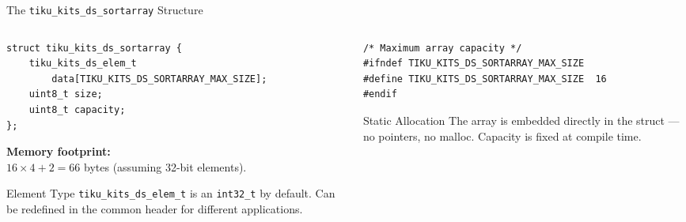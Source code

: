 \documentclass[aspectratio=169, 10pt]{beamer}
\begin{document}
\begin{frame}[fragile]{The \texttt{tiku\_kits\_ds\_sortarray} Structure}
\begin{columns}[T]
\begin{column}{0.48\textwidth}
\begin{lstlisting}[style=cstyle,
  title={Sorted array structure}]
struct tiku_kits_ds_sortarray {
    tiku_kits_ds_elem_t
        data[TIKU_KITS_DS_SORTARRAY_MAX_SIZE];
    uint8_t size;
    uint8_t capacity;
};
\end{lstlisting}

\vspace{0.3em}
\textbf{Memory footprint:}\\
$16 \times 4 + 2 = 66$ bytes (assuming 32-bit elements).

\vspace{0.5em}
\begin{block}{Element Type}
\texttt{tiku\_kits\_ds\_elem\_t} is an \texttt{int32\_t} by default.
Can be redefined in the common header for different
applications.
\end{block}
\end{column}

\begin{column}{0.48\textwidth}
\begin{lstlisting}[style=cstyle,
  title={Configuration macros}]
/* Maximum array capacity */
#ifndef TIKU_KITS_DS_SORTARRAY_MAX_SIZE
#define TIKU_KITS_DS_SORTARRAY_MAX_SIZE  16
#endif
\end{lstlisting}

\vspace{0.3em}
\begin{center}
\end{center}

\vspace{0.3em}
\begin{alertblock}{Static Allocation}
The array is embedded directly in the struct ---
no pointers, no malloc. Capacity is fixed at compile time.
\end{alertblock}
\end{column}
\end{columns}
\end{frame}
\end{document}
